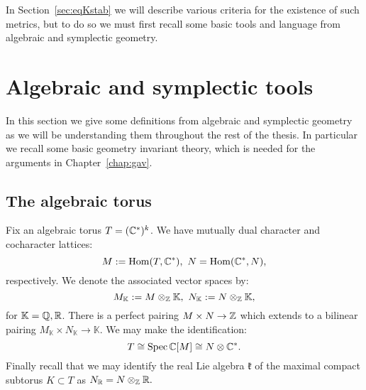 In Section~\ref{sec:eqKstab} we will describe various criteria for the existence of such metrics, but to do so we must first recall some basic tools and language from algebraic and symplectic geometry.
\section{Algebraic and symplectic tools} \label{basics}
In this section we give some definitions from algebraic and symplectic geometry as we will be understanding them throughout the rest of the thesis. In particular we recall some basic geometry invariant theory, which is needed for the arguments in Chapter~\ref{chap:gav}.
\subsection{The algebraic torus} \label{algtorus}
Fix an algebraic torus \(T = (\mathbb{C}^*)^k\). We have mutually dual character and cocharacter lattices:
\[
M := \operatorname{Hom}(T,\mathbb{C}^*), \ N = \operatorname{Hom}(\mathbb{C}^*,N),
\]
respectively. We denote the associated vector spaces by:
\[
M_\mathbb{K} := M \otimes_{\mathbb{Z}} \mathbb{K}, \ N_\mathbb{K} := N \otimes_{\mathbb{Z}} \mathbb{K},
\]
for \(\mathbb{K} = \mathbb{Q}, \mathbb{R}\). There is a perfect pairing \(M \times N \to \mathbb{Z}\) which extends to a bilinear pairing \(M_\mathbb{K} \times N_\mathbb{K} \to \mathbb{K}\). We may make the identification:
\[
T \cong \operatorname{Spec} \mathbb{C}[M] \cong N \otimes \mathbb{C}^*.
\]
Finally recall that we may identify the real Lie algebra \(\mathfrak{k}\) of the maximal compact subtorus \(K \subset T\) as \( N_{\mathbb{R}} = N \otimes_{\mathbb{Z}} \mathbb{R}.\)
